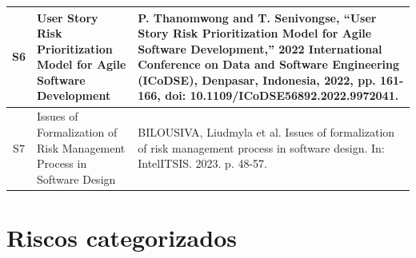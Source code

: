 \documentclass[
	12pt,
	openright,
	twoside,
	a4paper,
	english,
	brazil
	]{abntex2}
\begin{document}
\begin{apendices}
\begin{longtable}{|c|p{5.5cm}|p{7.5cm}|}
  \hline
  S6 & User Story Risk Prioritization Model for Agile Software Development & P. Thanomwong and T. Senivongse, “User Story Risk Prioritization Model for Agile Software Development,” 2022 International Conference on Data and Software Engineering (ICoDSE), Denpasar, Indonesia, 2022, pp. 161-166, doi: 10.1109/ICoDSE56892.2022.9972041. \\
  \hline
  S7 & Issues of Formalization of Risk Management Process in Software Design & BILOUSIVA, Liudmyla et al. Issues of formalization of risk management process in software design. In: IntelITSIS. 2023. p. 48-57. \\
  \hline
\end{longtable}


\chapter{Riscos categorizados}
\label{apendiceC}

\vspace{-2em} %



\end{apendices}
\end{document}
